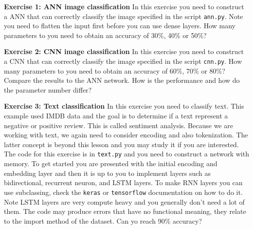 \documentclass[12pt,a4paper]{article} %
\numberwithin{equation}{section}
\begin{document}
		\textbf{Exercise 1: ANN image classification}\newline
		In this exercise you need to construct a ANN that can correctly classify the image specified in the script \texttt{ann.py}. Note you need to flatten the input first before you can use dense layers. How many parameters to you need to obtain an accuracy of 30\%, 40\% or 50\%?\newline
		
		\textbf{Exercise 2: CNN image classification}\newline
		In this exercise you need to construct a CNN that can correctly classify the image specified in the script \texttt{cnn.py}. How many parameters to you need to obtain an accuracy of 60\%, 70\% or 80\%? Compare the results to the ANN network. How is the performance and how do the parameter number differ? \newline
		
		\textbf{Exercise 3: Text classification}\newline
		In this exercise you need to classify text. This example used IMDB data and the goal is to determine if a text represent a negative or positive review. This is called sentiment analysis. Because we are working with text, we again need to consider encoding and also tokenization. The latter concept is beyond this lesson and you may study it if you are interested. The code for this exercise is in \texttt{text.py} and you need to construct a network with memory. To get started you are presented with the initial encoding and embedding layer and then it is up to you to implement layers such as bidirectional, recurrent neuron, and LSTM layers. To make RNN layers you can use subclassing, check the \texttt{keras} or \texttt{tensorflow} documentation on how to do it. Note LSTM layers are very compute heavy and you generally don't need a lot of them. The code may produce errors that have no functional meaning, they relate to the import method of the dataset. Can yo reach 90\% accuracy?
		
		
\end{document}
